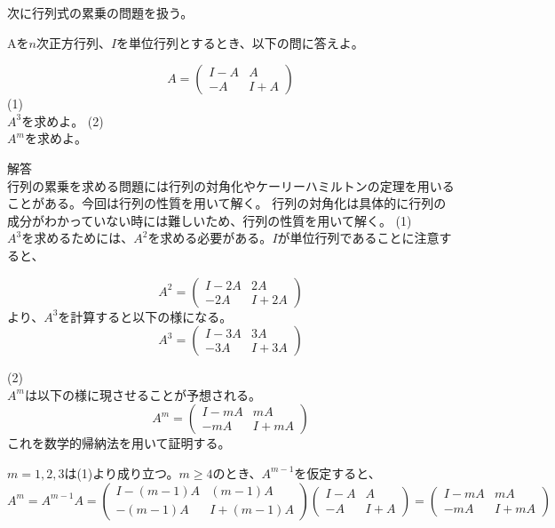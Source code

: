 \documentclass{jlreq}
\begin{document}
次に行列式の累乗の問題を扱う。

\begin{problem}
  Aを$n$次正方行列、$I$を単位行列とするとき、以下の問に答えよ。

  \begin{equation*}
    A = \begin{pmatrix}
      I - A & A \\
      -A & I + A
    \end{pmatrix}
  \end{equation*}
  (1) \\
  $A^3$を求めよ。
  (2) \\
  $A^m$を求めよ。

  \dotfill

  解答 \\
  行列の累乗を求める問題には行列の対角化やケーリーハミルトンの定理を用いることがある。今回は行列の性質を用いて解く。
  行列の対角化は具体的に行列の成分がわかっていない時には難しいため、行列の性質を用いて解く。
  (1) \\
  $A^3$を求めるためには、$A^2$を求める必要がある。$I$が単位行列であることに注意すると、

  \begin{equation*}
    A^2 = \begin{pmatrix}
      I - 2A & 2A \\
      -2A & I + 2A
    \end{pmatrix}
  \end{equation*}
  より、$A^3$を計算すると以下の様になる。
  \begin{equation*}
    A^3 = \begin{pmatrix}
      I - 3A & 3A \\
      -3 A & I + 3A
    \end{pmatrix}
  \end{equation*}

  (2) \\
  $A^m$は以下の様に現させることが予想される。
  \begin{equation*}
    A^m = \begin{pmatrix}
      I - mA & mA \\
      -mA & I + mA
    \end{pmatrix}
  \end{equation*}
  これを数学的帰納法を用いて証明する。

  $m = 1, 2, 3$は(1)より成り立つ。$m \geq 4$のとき、$A^{m - 1}$を仮定すると、
  \begin{equation*}
    A^{m} = A^{m - 1} A = \begin{pmatrix}
      I - (m - 1)A & (m - 1)A \\
      -(m - 1)A & I + (m - 1)A
    \end{pmatrix} \begin{pmatrix}
      I - A & A \\
      -A & I + A
    \end{pmatrix}
    = \begin{pmatrix}
      I - mA & mA \\
      -mA & I + mA
    \end{pmatrix}
  \end{equation*} 
\end{problem}
\end{document}
